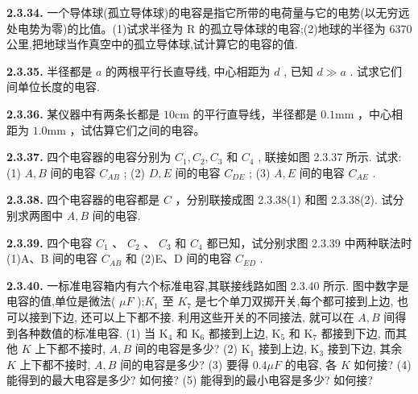 \vfill
\newpage

\textbf{2.3.34.} 一个导体球(孤立导体球)的电容是指它所带的电荷量与它的电势(以无穷远处电势为零)的比值。(1)试求半径为 R 的孤立导体球的电容;(2)地球的半径为 6370 公里,把地球当作真空中的孤立导体球,试计算它的电容的值.

\vfill
\newpage

\textbf{2.3.35.} 半径都是 $a$ 的两根平行长直导线, 中心相距为 $d$ , 已知 $d \gg a$ . 试求它们间单位长度的电容.

\vfill
\newpage

\textbf{2.3.36.} 某仪器中有两条长都是 $10\mathrm{cm}$ 的平行直导线，半径都是 $0.1\mathrm{mm}$ ，中心相距为 $1.0\mathrm{mm}$ ，试估算它们之间的电容。

\vfill
\newpage

\textbf{2.3.37.} 四个电容器的电容分别为 $C_1, C_2, C_3$ 和 $C_4$ , 联接如图 2.3.37 所示. 试求: (1) $A, B$ 间的电容 $C_{AB}$ ; (2) $D, E$ 间的电容 $C_{DE}$ ; (3) $A, E$ 间的电容 $C_{AE}$ .

\vfill
\newpage

\textbf{2.3.38.} 四个电容器的电容都是 $C$ ，分别联接成图 2.3.38(1) 和图 2.3.38(2). 试分别求两图中 $A, B$ 间的电容.

\begin{center}
  \begin{minipage}[b]{0.47\linewidth}
    \centering
  \end{minipage}\hfill
  \begin{minipage}[b]{0.47\linewidth}
    \centering
  \end{minipage}
\end{center}

\vfill
\newpage

\textbf{2.3.39.} 四个电容 $C_{1}$ 、 $C_{2}$ 、 $C_{3}$ 和 $C_{4}$ 都已知，试分别求图 2.3.39 中两种联法时(1)A、B 间的电容 $C_{AB}$ 和 (2)E、D 间的电容 $C_{ED}$ .

\vfill
\newpage

\textbf{2.3.40.} 一标准电容箱内有六个标准电容,其联接线路如图 2.3.40 所示. 图中数字是电容的值,单位是微法( $\mu F$ );$K_1$ 至 $K_7$ 是七个单刀双掷开关,每个都可接到上边, 也可以接到下边, 还可以上下都不接. 利用这些开关的不同接法, 就可以在 $A, B$ 间得到各种数值的标准电容. (1) 当 $\mathrm{K}_4$ 和 $\mathrm{K}_6$ 都接到上边, $\mathrm{K}_5$ 和 $\mathrm{K}_7$ 都接到下边, 而其他 $K$ 上下都不接时, $A, B$ 间的电容是多少? (2) $\mathrm{K}_1$ 接到上边, $\mathrm{K}_3$ 接到下边, 其余 $K$ 上下都不接时, $A, B$ 间的电容是多少? (3) 要得 $0.4\mu F$ 的电容, 各 $K$ 如何接? (4) 能得到的最大电容是多少? 如何接? (5) 能得到的最小电容是多少? 如何接?


